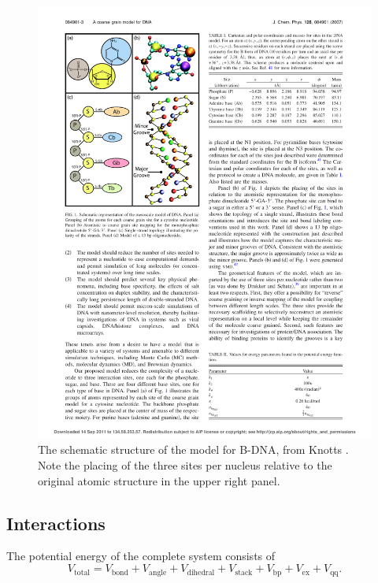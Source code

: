 \begin{figure}[h]
\begin{center}
\includegraphics{schematic_structure_knotts}
\caption{The schematic structure of the model for B-DNA, from Knotts \etal \cite{knotts2007coarse}. Note the placing of the three sites per nucleus relative to the original atomic structure in the upper right panel.}
\label{schematic_knotts}
\end{center}
\end{figure}




\subsection{Interactions}

The potential energy of the complete system consists of
\begin{equation}
V_\text{total} = V_\text{bond} + V_\text{angle} + V_\text{dihedral} + V_\text{stack} + V_\text{bp} + V_\text{ex} + V_\text{qq}.
\end{equation}

